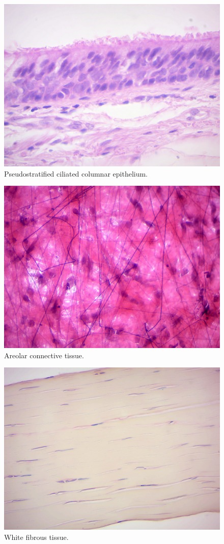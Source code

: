 \begin{figure}

{\centering \includegraphics[width=0.7\linewidth]{./figures/tissues/pseudostratified_ciliated_columnar}

}

\caption{Pseudostratified ciliated columnar epithelium.}\label{fig:pseudociliated}
\end{figure}

\begin{figure}

{\centering \includegraphics[width=0.7\linewidth]{./figures/tissues/areolar_spread}

}

\caption{Areolar connective tissue.}\label{fig:areolar}
\end{figure}

\begin{figure}

{\centering \includegraphics[width=0.7\linewidth]{./figures/tissues/white_fibrous}

}

\caption{White fibrous tissue.}\label{fig:whitefibrous}
\end{figure}

